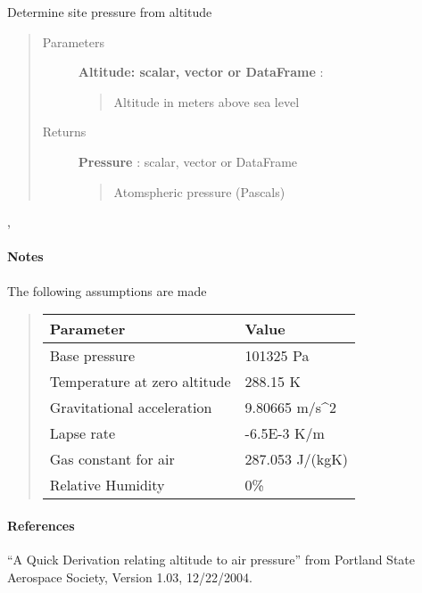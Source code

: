 \documentclass[letterpaper,10pt,english]{sphinxmanual}
\begin{document}
\begin{fulllineitems}
\label{stubs/pvlib.pvl_alt2pres:pvlib.pvl_alt2pres}
Determine site pressure from altitude
\begin{quote}\begin{description}
\item[{Parameters}] \leavevmode
\textbf{Altitude: scalar, vector or DataFrame} :
\begin{quote}

Altitude in meters above sea level
\end{quote}

\item[{Returns}] \leavevmode
\textbf{Pressure} : scalar, vector or DataFrame
\begin{quote}

Atomspheric pressure (Pascals)
\end{quote}

\end{description}\end{quote}




{\hyperref[stubs/pvlib.pvl_alt2pres:pvlib.pvl_alt2pres]{}}, {\hyperref[stubs/pvlib.pvl_makelocationstruct:pvlib.pvl_makelocationstruct]{}}


\paragraph{Notes}

The following assumptions are made
\begin{quote}

\begin{tabulary}{\linewidth}{|L|L|}
\hline
\textsf{\relax 
Parameter
} & \textsf{\relax 
Value
}\\
\hline
Base pressure
 & 
101325 Pa
\\

Temperature at zero altitude
 & 
288.15 K
\\

Gravitational acceleration
 & 
9.80665 m/s\textasciicircum{}2
\\

Lapse rate
 & 
-6.5E-3 K/m
\\

Gas constant for air
 & 
287.053 J/(kgK)
\\

Relative Humidity
 & 
0\%
\\
\hline\end{tabulary}

\end{quote}
\paragraph{References}

``A Quick Derivation relating altitude to air pressure'' from Portland
State Aerospace Society, Version 1.03, 12/22/2004.

\end{fulllineitems}
\end{document}
